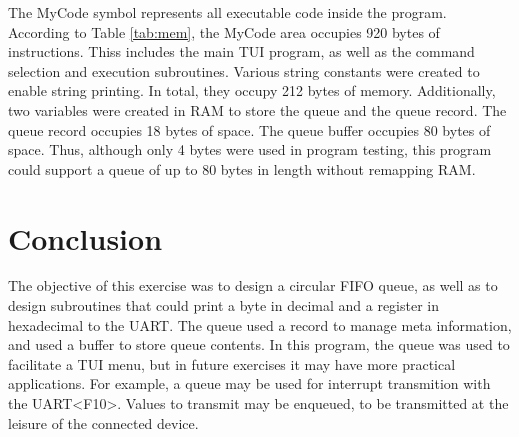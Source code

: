 \documentclass[CMPE]{KGCOEReport}
\begin{document}
The MyCode symbol represents all executable code inside the program. According
to Table \ref{tab:mem}, the MyCode area occupies 920 bytes of instructions.
Thiss includes the main TUI program, as well as the command selection and
execution subroutines. Various string constants were created to enable string
printing. In total, they occupy 212 bytes of memory. Additionally, two
variables were created in RAM to store the queue and the queue record. The
queue record occupies 18 bytes of space. The queue buffer occupies 80 bytes of
space. Thus, although only 4 bytes were used in program testing, this program
could support a queue of up to 80 bytes in length without remapping RAM.

\section*{Conclusion}

The objective of this exercise was to design a circular FIFO queue, as well as
to design  subroutines that could print a byte in decimal and a register in
hexadecimal to the UART. The queue used a record to manage meta information,
and used a buffer to store queue contents. In this program, the queue was used
to facilitate a TUI menu, but in future exercises it may have more practical
applications. For example, a queue may be used for interrupt transmition with
the UART<F10>. Values to transmit may be enqueued, to be transmitted at the
leisure of the connected device.


\end{document}
